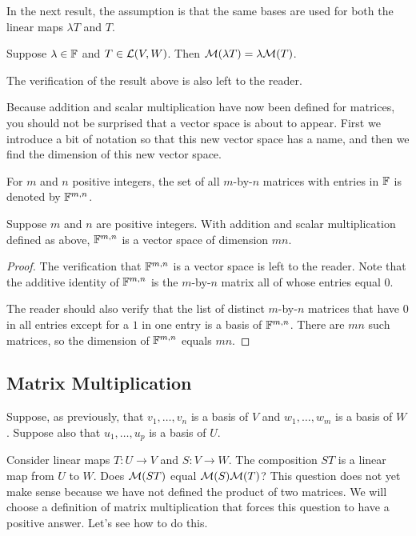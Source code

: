 In the next result, the assumption is that the same bases are used for both the
linear maps $\lambda T$ and $T$.

\begin{result}\label{ax:3.38}
Suppose $\lambda\in\mathbb{F}$ and $T\in\mathcal{L}(V,W)$. Then
$\mathcal{M}(\lambda T)=\lambda\mathcal{M}(T)$.
\end{result}

The verification of the result above is also left to the reader.

Because addition and scalar multiplication have now been defined for matrices,
you should not be surprised that a vector space is about to appear. First we
introduce a bit of notation so that this new vector space has a name, and then
we find the dimension of this new vector space.

\begin{notation}[$\F^{m,n}$]\label{ax:3.39}
For $m$ and $n$ positive integers, the set of all $m$-by-$n$ matrices with
entries in $\mathbb{F}$ is denoted by $\F^{m,n}$.
\end{notation}

\begin{result}[$\dim\F^{m,n}=mn$]\label{ax:3.40}
Suppose $m$ and $n$ are positive integers. With addition and scalar
multiplication defined as above, $\F^{m,n}$ is a vector space of dimension
$mn$.
\end{result}

\begin{proof}
The verification that $\F^{m,n}$ is a vector space is left to the reader. Note
that the additive identity of $\F^{m,n}$ is the $m$-by-$n$ matrix all of whose
entries equal $0$.

The reader should also verify that the list of distinct $m$-by-$n$ matrices
that have $0$ in all entries except for a $1$ in one entry is a basis of
$\F^{m,n}$. There are $mn$ such matrices, so the dimension of $\F^{m,n}$ equals
$mn$.
\end{proof}

\subsection{Matrix Multiplication}

Suppose, as previously, that $v_1,\dots,v_n$ is a basis of $V$ and
$w_1,\dots,w_m$ is a basis of $W$. Suppose also that $u_1,\dots,u_p$ is a basis
of $U$.

Consider linear maps $T\colon U\to V$ and $S\colon V\to W$. The composition
$ST$ is a linear map from $U$ to $W$. Does $\mathcal{M}(ST)$ equal $\mathcal{M}(S)\mathcal{M}(T)$?
This question does not yet make sense because we have not defined the product
of two matrices. We will choose a definition of matrix multiplication that
forces this question to have a positive answer. Let's see how to do this.


